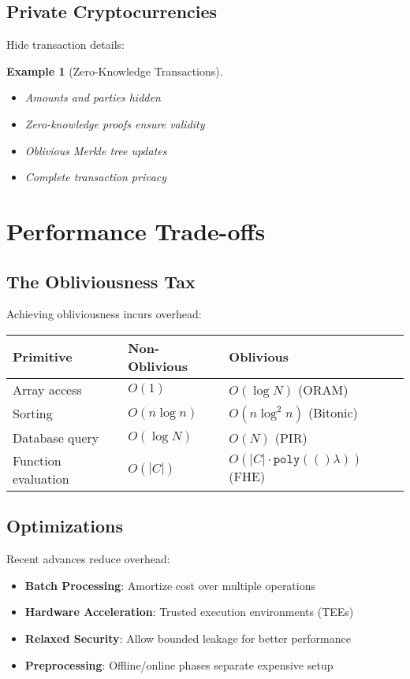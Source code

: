 \documentclass[11pt,final,hidelinks]{article}
\newtheorem{example}[theorem]{Example}
\newcommand{\poly}[1]{\mathtt{poly}(#1)}
\begin{document}
\subsection{Private Cryptocurrencies}

Hide transaction details:

\begin{example}[Zero-Knowledge Transactions]
\begin{itemize}
    \item Amounts and parties hidden
    \item Zero-knowledge proofs ensure validity
    \item Oblivious Merkle tree updates
    \item Complete transaction privacy
\end{itemize}
\end{example}

\section{Performance Trade-offs}

\subsection{The Obliviousness Tax}

Achieving obliviousness incurs overhead:

\begin{center}
\begin{tabular}{lll}
\textbf{Primitive} & \textbf{Non-Oblivious} & \textbf{Oblivious} \\
\hline
Array access & $O(1)$ & $O(\log N)$ (ORAM) \\
Sorting & $O(n \log n)$ & $O(n \log^2 n)$ (Bitonic) \\
Database query & $O(\log N)$ & $O(N)$ (PIR) \\
Function evaluation & $O(|C|)$ & $O(|C| \cdot \poly(\lambda))$ (FHE) \\
\end{tabular}
\end{center}

\subsection{Optimizations}

Recent advances reduce overhead:
\begin{itemize}
    \item \textbf{Batch Processing}: Amortize cost over multiple operations
    \item \textbf{Hardware Acceleration}: Trusted execution environments (TEEs)
    \item \textbf{Relaxed Security}: Allow bounded leakage for better performance
    \item \textbf{Preprocessing}: Offline/online phases separate expensive setup
\end{itemize}
\end{document}

